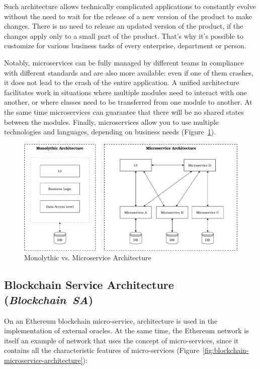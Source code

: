 \documentclass{article}
\begin{document}
\begin{multicols}{2}
Such architecture allows technically complicated applications to constantly evolve without the need to wait for the release of a new version of the product to make changes. There is no need to release an updated version of the product, if the changes apply only to a small part of the product. That’s why it’s possible to customize for various business tasks of every enterprise, department or person.

Notably, microservices can be fully managed by different teams in compliance with different standards and are also more available: even if one of them crashes, it does not lead to the crash of the entire application. A unified architecture facilitates work in situations where multiple modules need to interact with one another, or where classes need to be transferred from one module to another. At the same time microservices can guarantee that there will be no shared states between the modules. Finally, microservices allow you to use multiple technologies and languages, depending on business needs (Figure~\ref{fig:microservice-vs-monolyth}).

\begin{figure}
  \centering
  \includegraphics[width=\textwidth]{microservice-vs-monolyth.pdf}
  \caption{Monolythic vs. Microservice Architecture}
  \label{fig:microservice-vs-monolyth}
\end{figure}

\subsection{Blockchain Serviсe Architecture (\textit{Blockchain~SA})}

On an Ethereum blockchain micro-service, architecture is used in the implementation of external oracles. At the same time, the Ethereum network is itself an example of network that uses the concept of micro-services, since it contains all the characteristic features of micro-services
(Figure~\ref{fig:blockchain-microservice-architecture}):


\end{multicols}
\end{document}
